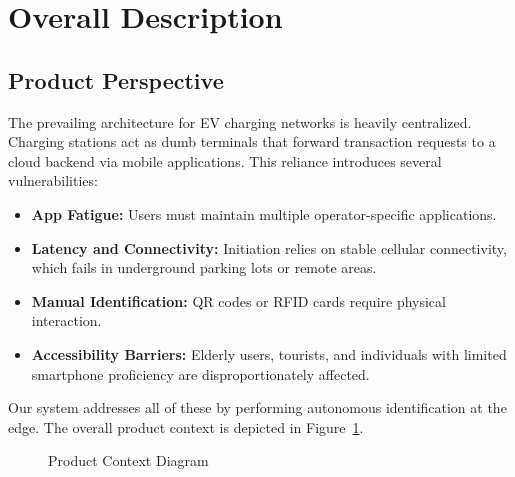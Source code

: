 \section{Overall Description}
\subsection{Product Perspective}
The prevailing architecture for EV charging networks is heavily centralized. Charging stations act as dumb terminals that forward transaction requests to a cloud backend via mobile applications. This reliance introduces several vulnerabilities:
\begin{itemize}
    \item \textbf{App Fatigue:} Users must maintain multiple operator-specific applications.
    \item \textbf{Latency and Connectivity:} Initiation relies on stable cellular connectivity, which fails in underground parking lots or remote areas.
    \item \textbf{Manual Identification:} QR codes or RFID cards require physical interaction.
    \item \textbf{Accessibility Barriers:} Elderly users, tourists, and individuals with limited smartphone proficiency are disproportionately affected.
\end{itemize}
Our system addresses all of these by performing autonomous identification at the edge. The overall product context is depicted in Figure~\ref{fig:product_context}.

\begin{figure}[H]
\centering
{}
\caption{Product Context Diagram}
\label{fig:product_context}
\end{figure}

